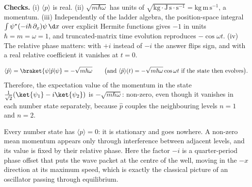 \begin{solutionbox}
\textbf{Checks.} (i) $\langle p\rangle$ is real. (ii) $\sqrt{m\hbar\omega}$ has units of $\sqrt{\mathrm{kg\cdot J\,s\cdot s^{-1}}}=\mathrm{kg\,m\,s^{-1}}$, a momentum. (iii) Independently of the ladder algebra, the position-space integral $\int\psi^*(-i\hbar\,\partial_x)\psi\,\d x$ over explicit Hermite functions gives $-1$ in units $\hbar=m=\omega=1$, and truncated-matrix time evolution reproduces $-\cos\omega t$. (iv) The relative phase matters: with $+i$ instead of $-i$ the answer flips sign, and with a real relative coefficient it vanishes at $t=0$.
\end{solutionbox}

\begin{answerbox}
\[
\langle\hat p\rangle=\braket{\psi|\hat p|\psi}=-\sqrt{m\hbar\omega}\qquad\big(\text{and }\langle\hat p\rangle(t)=-\sqrt{m\hbar\omega}\cos\omega t\text{ if the state then evolves}\big).
\]
Therefore, the expectation value of the momentum in the state $\frac{1}{\sqrt2}(\ket{\psi_1}-i\ket{\psi_2})$ is $-\sqrt{m\hbar\omega}$: non-zero, even though it vanishes in each number state separately, because $\hat p$ couples the neighbouring levels $n=1$ and $n=2$.
\end{answerbox}

\begin{insightbox}
Every number state has $\langle p\rangle=0$: it is stationary and goes nowhere. A non-zero mean momentum appears only through interference between adjacent levels, and its value is fixed by their relative phase. Here the factor $-i$ is a quarter-period phase offset that puts the wave packet at the centre of the well, moving in the $-x$ direction at its maximum speed, which is exactly the classical picture of an oscillator passing through equilibrium.
\end{insightbox}
